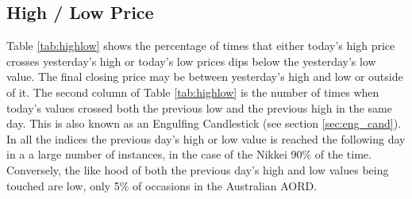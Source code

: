 

\subsection{High / Low Price}
Table \ref{tab:highlow} shows the percentage of times that either today's high price crosses yesterday's high or today's low prices dips below the yesterday's low value. The final closing price may be between yesterday's high and low or outside of it. The second column of Table \ref{tab:highlow} is the number of times when today's values crossed both the previous low and the previous high in the same day. This is also known as an Engulfing Candlestick (see section \ref{sec:eng_cand}). In all the indices the previous day's high or low value is reached the following day in a  a large number of instances, in the case of the Nikkei 90\% of the time. Conversely, the like hood of both the previous day's high and low values being touched are low, only 5\% of occasions in the Australian AORD. 

